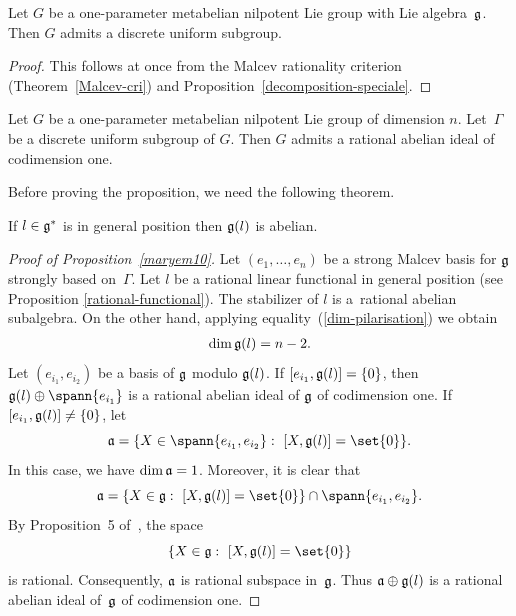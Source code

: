 \begin{proposition}
Let $G$ be a one-parameter metabelian nilpotent Lie group with Lie
algebra~$\frak g$.
 Then $G$ admits a discrete uniform subgroup.
\end{proposition}

\begin{proof} This follows at once from
 the  Malcev  rationality criterion
 (Theorem~\ref{Malcev-cri}) and Proposition~\ref{decomposition-speciale}.
 \end{proof}

\begin{proposition}\label{maryem10}
Let $G$ be a one-parameter metabelian nilpotent Lie group of
dimension $n$.
 Let~$\Gamma $ be a discrete uniform subgroup of $G$. Then $G$ admits a
rational
 abelian ideal of codimension one.
\end{proposition}

Before proving the proposition, we need the following theorem.
\begin{theorem}
If $l\in \frak g^*$ is in general position then $\frak g(l)$ is
abelian.
\end{theorem}

\begin{proof}[Proof of Proposition~\ref{maryem10}]
Let $(e_1, \ldots, e_{n})$ be a strong Malcev basis for $\frak g$
strongly based on~$\Gamma$. Let $l$ be a rational  linear functional
in general position (see Proposition \ref{rational-functional}).
 The stabilizer of $l$ is a~rational abelian  subalgebra. On the other hand, applying equality~(\ref{dim-pilarisation}) we obtain
\begin{gather}\label{dim-stab}
\dim{\frak g(l)}=
 n-2.
 \end{gather}
  Let $(e_{i_1}, e_{i_2})$  be a basis of
$\frak g$ modulo $\frak g(l)$. If $ [ e_{i_1}, \frak g(l)] = \lbrace
0\rbrace$, then $\frak g(l)\oplus \spann\lbrace e_{i_1}\rbrace$  is
a rational abelian ideal of $\frak g$ of codimension one. If $ [
e_{i_1}, \frak g(l)] \ne \lbrace 0 \rbrace$, let
\[
\frak a = \lbrace X \in \spann\lbrace e_{i_1}, e_{i_2}\rbrace:\
[ X, \frak g(l)] =\set{0}\rbrace.
\] In this case, we have $\dim
{\frak a} =1$. Moreover, it is clear that
\[
 \frak a = \lbrace X \in \frak g:\
[ X, \frak g(l)] =\set{0}\rbrace\cap \spann\lbrace e_{i_1},
e_{i_2}\rbrace.
\]
 By Proposition~5 of~\cite{Ghorbel1}, the space
\[
\lbrace X \in \frak g:\
[ X, \frak g(l)] =\set{0}\rbrace
\] is rational. Consequently, $\frak
a$ is rational subspace in~$\frak g$. Thus $\frak a \oplus \frak
g(l)$ is a rational abelian ideal of~$\frak g$ of codimension one.
\end{proof}
